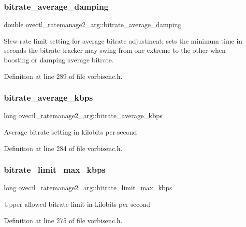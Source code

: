 \subsubsection{\texorpdfstring{bitrate\_average\_damping}{bitrate\_average\_damping}}
{\footnotesize\ttfamily double ovectl\+\_\+ratemanage2\+\_\+arg\+::bitrate\+\_\+average\+\_\+damping}

Slew rate limit setting for average bitrate adjustment; sets the minimum time in seconds the bitrate tracker may swing from one extreme to the other when boosting or damping average bitrate. 

Definition at line 289 of file vorbisenc.\+h.

\mbox{\label{structovectl__ratemanage2__arg_a1f6bab60d87143d5060dd6c59aad6e71}} 
\subsubsection{\texorpdfstring{bitrate\_average\_kbps}{bitrate\_average\_kbps}}
{\footnotesize\ttfamily long ovectl\+\_\+ratemanage2\+\_\+arg\+::bitrate\+\_\+average\+\_\+kbps}

Average bitrate setting in kilobits per second 

Definition at line 284 of file vorbisenc.\+h.

\mbox{\label{structovectl__ratemanage2__arg_a175691482003edd7d94592fa2bc993a9}} 
\subsubsection{\texorpdfstring{bitrate\_limit\_max\_kbps}{bitrate\_limit\_max\_kbps}}
{\footnotesize\ttfamily long ovectl\+\_\+ratemanage2\+\_\+arg\+::bitrate\+\_\+limit\+\_\+max\+\_\+kbps}

Upper allowed bitrate limit in kilobits per second 

Definition at line 275 of file vorbisenc.\+h.

\mbox{\label{structovectl__ratemanage2__arg_aeb53a17fff14ec50d143602adfdeabeb}} 
